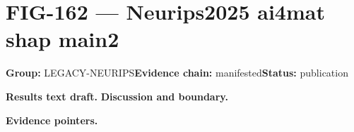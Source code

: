\clearpage
\section{FIG-162 --- Neurips2025 ai4mat shap main2}
\label{figpage:fig-162}
\textbf{Group:} LEGACY-NEURIPS\quad \textbf{Evidence chain:} manifested\quad \textbf{Status:} publication

\textbf{Results text draft.} 
\textbf{Discussion and boundary.} 


\textbf{Evidence pointers.}



\vfill
